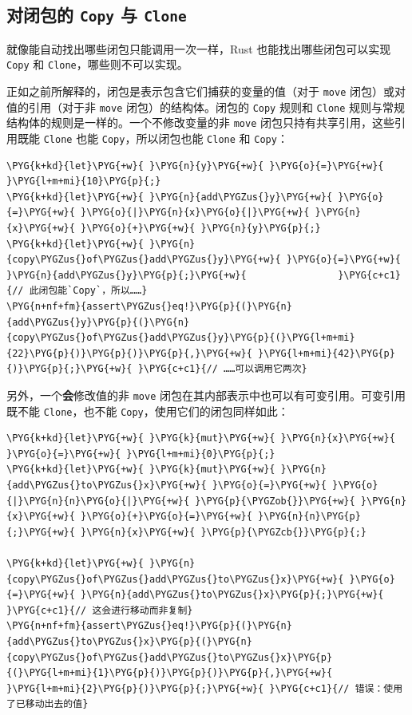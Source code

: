 \subsection{对闭包的 \texttt{Copy} 与 \texttt{Clone}}

就像能自动找出哪些闭包只能调用一次一样，Rust 也能找出哪些闭包可以实现 \texttt{Copy} 和 \texttt{Clone}，哪些则不可以实现。

正如之前所解释的，闭包是表示包含它们捕获的变量的值（对于 \texttt{move} 闭包）或对值的引用（对于非 \texttt{move} 闭包）的结构体。闭包的 \texttt{Copy} 规则和 \texttt{Clone} 规则与常规结构体的规则是一样的。一个不修改变量的非 \texttt{move} 闭包只持有共享引用，这些引用既能 \texttt{Clone} 也能 \texttt{Copy}，所以闭包也能 \texttt{Clone} 和 \texttt{Copy}：

\begin{Verbatim}[commandchars=\\\{\},breaklines=true,breakanywhere=true,fontsize=\codefont,xleftmargin=17bp]
\PYG{k+kd}{let}\PYG{+w}{ }\PYG{n}{y}\PYG{+w}{ }\PYG{o}{=}\PYG{+w}{ }\PYG{l+m+mi}{10}\PYG{p}{;}
\PYG{k+kd}{let}\PYG{+w}{ }\PYG{n}{add\PYGZus{}y}\PYG{+w}{ }\PYG{o}{=}\PYG{+w}{ }\PYG{o}{|}\PYG{n}{x}\PYG{o}{|}\PYG{+w}{ }\PYG{n}{x}\PYG{+w}{ }\PYG{o}{+}\PYG{+w}{ }\PYG{n}{y}\PYG{p}{;}
\PYG{k+kd}{let}\PYG{+w}{ }\PYG{n}{copy\PYGZus{}of\PYGZus{}add\PYGZus{}y}\PYG{+w}{ }\PYG{o}{=}\PYG{+w}{ }\PYG{n}{add\PYGZus{}y}\PYG{p}{;}\PYG{+w}{                }\PYG{c+c1}{// 此闭包能`Copy`，所以……}
\PYG{n+nf+fm}{assert\PYGZus{}eq!}\PYG{p}{(}\PYG{n}{add\PYGZus{}y}\PYG{p}{(}\PYG{n}{copy\PYGZus{}of\PYGZus{}add\PYGZus{}y}\PYG{p}{(}\PYG{l+m+mi}{22}\PYG{p}{)}\PYG{p}{)}\PYG{p}{,}\PYG{+w}{ }\PYG{l+m+mi}{42}\PYG{p}{)}\PYG{p}{;}\PYG{+w}{ }\PYG{c+c1}{// ……可以调用它两次}
\end{Verbatim}

另外，一个\textbf{会}修改值的非 \texttt{move} 闭包在其内部表示中也可以有可变引用。可变引用既不能 \texttt{Clone}，也不能 \texttt{Copy}，使用它们的闭包同样如此：

\begin{Verbatim}[commandchars=\\\{\},breaklines=true,breakanywhere=true,fontsize=\codefont,xleftmargin=17bp]
\PYG{k+kd}{let}\PYG{+w}{ }\PYG{k}{mut}\PYG{+w}{ }\PYG{n}{x}\PYG{+w}{ }\PYG{o}{=}\PYG{+w}{ }\PYG{l+m+mi}{0}\PYG{p}{;}
\PYG{k+kd}{let}\PYG{+w}{ }\PYG{k}{mut}\PYG{+w}{ }\PYG{n}{add\PYGZus{}to\PYGZus{}x}\PYG{+w}{ }\PYG{o}{=}\PYG{+w}{ }\PYG{o}{|}\PYG{n}{n}\PYG{o}{|}\PYG{+w}{ }\PYG{p}{\PYGZob{}}\PYG{+w}{ }\PYG{n}{x}\PYG{+w}{ }\PYG{o}{+}\PYG{o}{=}\PYG{+w}{ }\PYG{n}{n}\PYG{p}{;}\PYG{+w}{ }\PYG{n}{x}\PYG{+w}{ }\PYG{p}{\PYGZcb{}}\PYG{p}{;}

\PYG{k+kd}{let}\PYG{+w}{ }\PYG{n}{copy\PYGZus{}of\PYGZus{}add\PYGZus{}to\PYGZus{}x}\PYG{+w}{ }\PYG{o}{=}\PYG{+w}{ }\PYG{n}{add\PYGZus{}to\PYGZus{}x}\PYG{p}{;}\PYG{+w}{         }\PYG{c+c1}{// 这会进行移动而非复制}
\PYG{n+nf+fm}{assert\PYGZus{}eq!}\PYG{p}{(}\PYG{n}{add\PYGZus{}to\PYGZus{}x}\PYG{p}{(}\PYG{n}{copy\PYGZus{}of\PYGZus{}add\PYGZus{}to\PYGZus{}x}\PYG{p}{(}\PYG{l+m+mi}{1}\PYG{p}{)}\PYG{p}{)}\PYG{p}{,}\PYG{+w}{ }\PYG{l+m+mi}{2}\PYG{p}{)}\PYG{p}{;}\PYG{+w}{ }\PYG{c+c1}{// 错误：使用了已移动出去的值}
\end{Verbatim}

